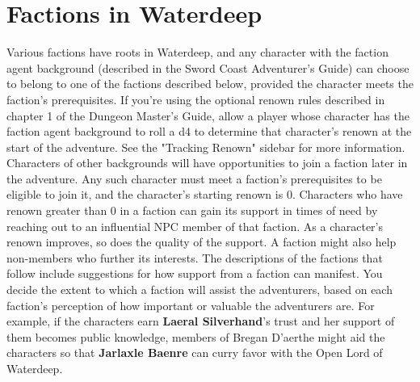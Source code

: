 \documentclass[10pt,a4paper,twoside,twocolumn,openany,nodeprecatedcode]{dndbook}
\begin{document}
\section{Factions in Waterdeep}
Various factions have roots in Waterdeep, and any character with the faction agent background (described in the Sword Coast Adventurer's Guide) can choose to belong to one of the factions described below, provided the character meets the faction's prerequisites.
If you're using the optional renown rules described in chapter 1 of the Dungeon Master's Guide, allow a player whose character has the faction agent background to roll a d4 to determine that character's renown at the start of the adventure. See the "Tracking Renown" sidebar for more information.
Characters of other backgrounds will have opportunities to join a faction later in the adventure. Any such character must meet a faction's prerequisites to be eligible to join it, and the character's starting renown is 0.
Characters who have renown greater than 0 in a faction can gain its support in times of need by reaching out to an influential NPC member of that faction. As a character's renown improves, so does the quality of the support. A faction might also help non-members who further its interests. The descriptions of the factions that follow include suggestions for how support from a faction can manifest.
You decide the extent to which a faction will assist the adventurers, based on each faction's perception of how important or valuable the adventurers are. For example, if the characters earn \textbf{Laeral Silverhand}'s trust and her support of them becomes public knowledge, members of Bregan D'aerthe might aid the characters so that \textbf{Jarlaxle Baenre} can curry favor with the Open Lord of Waterdeep.
\end{document}

